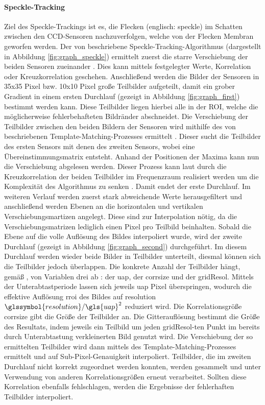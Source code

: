 \paragraph{Speckle-Tracking}
\label{sec:speckle-tracking}
Ziel des Speckle-Trackings ist es, die Flecken (englisch: speckle) im Schatten zwischen den \gls{CCD}-Sensoren nachzuverfolgen, welche von der Flecken Membran geworfen werden. 
Der von \citeauthor{Ber13} beschriebene Speckle-Tracking-Algorithmus (dargestellt in Abbildung \ref{fig:graph_speckle}) ermittelt zuerst die starre Verschiebung der beiden Sensoren zueinander . Dies kann mittels festgelegter Werte, Korrelation oder Kreuzkorrelation geschehen. Anschließend werden die Bilder der Sensoren in 35x35 Pixel bzw. 10x10 Pixel große Teilbilder aufgeteilt, damit ein grober Gradient in einem ersten Durchlauf (gezeigt in Abbildung \ref{fig:graph_first}) bestimmt werden kann. Diese Teilbilder liegen hierbei alle in der \gls{ROI}, welche die möglicherweise fehlerbehafteten Bildränder abschneidet. Die Verschiebung der Teilbilder zwischen den beiden Bildern der Sensoren wird mithilfe des von \citeauthor{Lew94} beschriebenen Template-Matching-Prozesses ermittelt \cite{Lew94}. Dieser sucht die Teilbilder des ersten Sensors mit denen des zweiten Sensors, wobei eine Übereinstimmungsmatrix entsteht. Anhand der Positionen der Maxima kann nun die Verschiebung abgelesen werden. Dieser Prozess kann laut \citeauthor{Lew94} durch die Kreuzkorrelation der beiden Teilbilder im Frequenzraum realisiert werden um die Komplexität des Algorithmus zu senken \cite{Lew94}. Damit endet der erste Durchlauf. 
Im weiteren Verlauf werden zuerst stark abweichende Werte herausgefiltert und anschließend werden Ebenen an die horizontalen und vertikalen Verschiebungsmartizen angelegt. Diese sind zur Interpolation nötig, da die Verschiebungsmatrizen lediglich einen Pixel pro Teilbild beinhalten. Sobald die Ebene auf die volle Auflösung des Bildes interpoliert wurde, wird der zweite Durchlauf (gezeigt in Abbildung \ref{fig:graph_second}) durchgeführt. Im diesem Durchlauf werden wieder beide Bilder in Teilbilder unterteilt, diesmal können sich die Teilbilder jedoch überlappen. Die konkrete Anzahl der Teilbilder hängt, gemäß \citeauthor{Coj17}, von Variablen drei ab \cite{Coj17}: der \gls{uap}, der \gls{corrsize} und der \gls{gridResol}. Mittels der Unterabtastperiode lassen sich jeweils \gls{uap} Pixel überspringen, wodurch die effektive Auflösung \gls{rroi} des Bildes auf \glsdesc{resolution} $\glssymbol{resolution}/\gls{uap}^2$ reduziert wird. Die Korrelationsgröße \gls{corrsize} gibt die Größe der Teilbilder an. Die Gitterauflösung bestimmt die Größe des Resultats, indem jeweils ein Teilbild um jeden \gls{gridResol}-ten Punkt im bereits durch Unterabtastung verkleinerten Bild genutzt wird. 
Die Verschiebung der so ermittelten Teilbilder wird dann mittels des Template-Matching-Prozesses ermittelt und auf Sub-Pixel-Genauigkeit interpoliert. 
Teilbilder, die im zweiten Durchlauf nicht korrekt zugeordnet werden konnten, werden gesammelt und unter Verwendung von anderen Korrelationsgrößen erneut verarbeitet. Sollten diese Korrelation ebenfalls fehlschlagen, werden die Ergebnisse der fehlerhaften Teilbilder interpoliert. 

